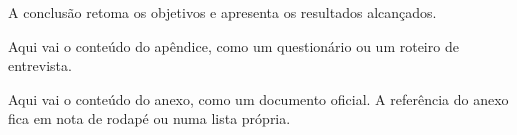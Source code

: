 \documentclass[12pt,a4paper,oneside]{article}
\begin{document}
A conclusão retoma os objetivos e apresenta os resultados alcançados.




\begin{glossario}
\end{glossario}

Aqui vai o conteúdo do apêndice, como um questionário ou um roteiro de entrevista.

Aqui vai o conteúdo do anexo, como um documento oficial. A referência do anexo fica em nota de rodapé ou numa lista própria.
\end{document}
